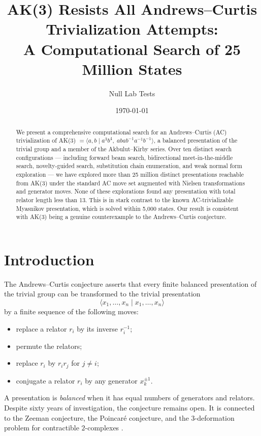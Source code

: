 \documentclass[12pt,a4paper]{article}
\title{AK(3) Resists All Andrews--Curtis Trivialization Attempts:\\A Computational Search of 25 Million States}
\author{Null Lab Tests}
\date{\today}
\begin{document}
\maketitle

\begin{abstract}
We present a comprehensive computational search for an Andrews--Curtis (AC) trivialization of AK(3) $= \langle a,b \mid a^3 b^4,\; a b a b^{-1} a^{-1} b^{-1} \rangle$, a balanced presentation of the trivial group and a member of the Akbulut--Kirby series. Over ten distinct search configurations --- including forward beam search, bidirectional meet-in-the-middle search, novelty-guided search, substitution chain enumeration, and weak normal form exploration --- we have explored more than 25 million distinct presentations reachable from AK(3) under the standard AC move set augmented with Nielsen transformations and generator moves. None of these explorations found any presentation with total relator length less than 13. This is in stark contrast to the known AC-trivializable Myasnikov presentation, which is solved within 5,000 states. Our result is consistent with AK(3) being a genuine counterexample to the Andrews--Curtis conjecture.
\end{abstract}

\section{Introduction}

The Andrews--Curtis conjecture \cite{andrews1965free,andrews1966extended} asserts that every finite balanced presentation of the trivial group can be transformed to the trivial presentation
\[
\langle x_1,\dots,x_n \mid x_1,\dots,x_n \rangle
\]
by a finite sequence of the following moves:
\begin{itemize}
  \item[(AC1)] replace a relator $r_i$ by its inverse $r_i^{-1}$;
  \item[(AC2)] permute the relators;
  \item[(AC3)] replace $r_i$ by $r_i r_j$ for $j \neq i$;
  \item[(AC3')] conjugate a relator $r_i$ by any generator $x_k^{\pm 1}$.
\end{itemize}

A presentation is \emph{balanced} when it has equal numbers of generators and relators. Despite sixty years of investigation, the conjecture remains open. It is connected to the Zeeman conjecture, the Poincar\'e conjecture, and the $3$-deformation problem for contractible $2$-complexes \cite{bridson2015complexity}.
\end{document}
